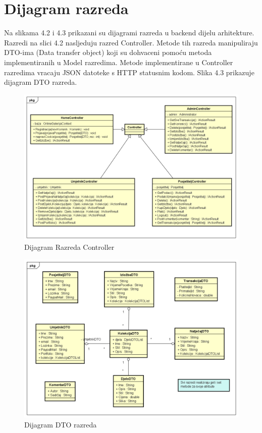 			\eject
			
			
		\section{Dijagram razreda}
		
			{Na slikama 4.2 i 4.3 prikazani su dijagrami razreda u backend dijelu arhitekture.
			Razredi na slici 4.2 nasljeduju razred Controller. Metode tih razreda manipuliraju
			DTO-ima (Data transfer object) koji su dohvaceni pomoću metoda implementiranih
			u Model razredima. Metode implementirane u Controller razredima vracaju JSON
			datoteke s HTTP statusnim kodom. Slika 4.3 prikazuje dijagram DTO razreda. 	
			\vspace{10mm}
			
			\graphicspath{ {./slike/} }
			\begin{figure}[H]
				
				\includegraphics[width=\textwidth,height=\textheight,keepaspectratio]{Controller Class Diagram}
				\caption{Dijagram Razreda Controller }
				
			\end{figure}
			
				\begin{figure}[H]
				
				\includegraphics[width=\textwidth,height=\textheight,keepaspectratio]{DTOdijagram}
				\caption{Dijagram DTO razreda }
				

\end{figure}}
